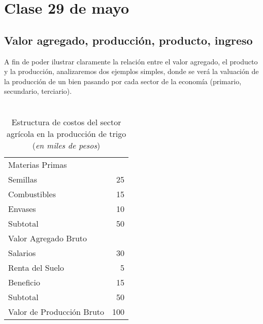 \section{Clase 29 de mayo}

\subsection{Valor agregado, producción, producto, ingreso}

A fin de poder ilustrar claramente la relación entre el valor agregado,
el producto y la producción,
analizaremos dos ejemplos simples,
donde se verá la valuación de la producción de un bien
pasando por cada sector de la economía
(primario, secundario, terciario).

\vspace{.5cm}
\begin{table}[H]
    \centering
    \caption{\\Estructura de costos del sector agrícola en la producción de trigo\\
        (\textit{en miles de pesos})}
    \vspace{.5cm}
    \begin{tabular}{lr}
        \hline
        Materias Primas               &     \\
        \hspace{.3cm} Semillas        & 25  \\
        \hspace{.3cm} Combustibles    & 15  \\
        \hspace{.3cm} Envases         & 10  \\
        Subtotal                      & 50  \\
        \hline
        Valor Agregado Bruto          &     \\
        \hspace{.3cm} Salarios        & 30  \\
        \hspace{.3cm} Renta del Suelo & 5   \\
        \hspace{.3cm} Beneficio       & 15  \\
        Subtotal                      & 50  \\
        \hline
        Valor de Producción Bruto     & 100 \\
    \end{tabular}
\end{table}
\vspace{.5cm}

